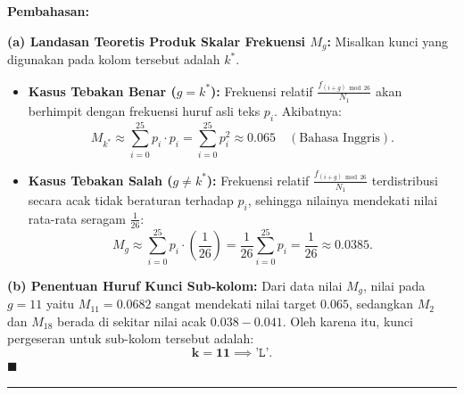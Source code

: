 \documentclass[11pt,a4paper]{article}
\newenvironment{solusi}{\noindent\textbf{\textsf{Pembahasan:}}\par\vspace{0.2em}}{\hfill$\blacksquare$\vspace{1em}\par\hrule\vspace{1em}}
\begin{document}
\begin{solusi}
\textbf{(a) Landasan Teoretis Produk Skalar Frekuensi $M_g$:}
Misalkan kunci yang digunakan pada kolom tersebut adalah $k^*$.
\begin{itemize}[leftmargin=*]
    \item \textbf{Kasus Tebakan Benar ($g = k^*$):}
    Frekuensi relatif $\frac{f_{(i+g) \bmod 26}}{N_1}$ akan berhimpit dengan frekuensi huruf asli teks $p_i$. Akibatnya:
    \[
    M_{k^*} \approx \sum_{i=0}^{25} p_i \cdot p_i = \sum_{i=0}^{25} p_i^2 \approx 0.065 \quad (\text{Bahasa Inggris}).
    \]
    \item \textbf{Kasus Tebakan Salah ($g \ne k^*$):}
    Frekuensi relatif $\frac{f_{(i+g) \bmod 26}}{N_1}$ terdistribusi secara acak tidak beraturan terhadap $p_i$, sehingga nilainya mendekati nilai rata-rata seragam $\frac{1}{26}$:
    \[
    M_g \approx \sum_{i=0}^{25} p_i \cdot \left(\frac{1}{26}\right) = \frac{1}{26} \sum_{i=0}^{25} p_i = \frac{1}{26} \approx 0.0385.
    \]
\end{itemize}

\vspace{0.2cm}
\textbf{(b) Penentuan Huruf Kunci Sub-kolom:}
Dari data nilai $M_g$, nilai pada $g = 11$ yaitu $M_{11} = 0.0682$ sangat mendekati nilai target $0.065$, sedangkan $M_2$ dan $M_{18}$ berada di sekitar nilai acak $0.038 - 0.041$.
Oleh karena itu, kunci pergeseran untuk sub-kolom tersebut adalah:
\[
\mathbf{k = 11 \implies \texttt{'L'}}.
\]
\end{solusi}

\end{document}
